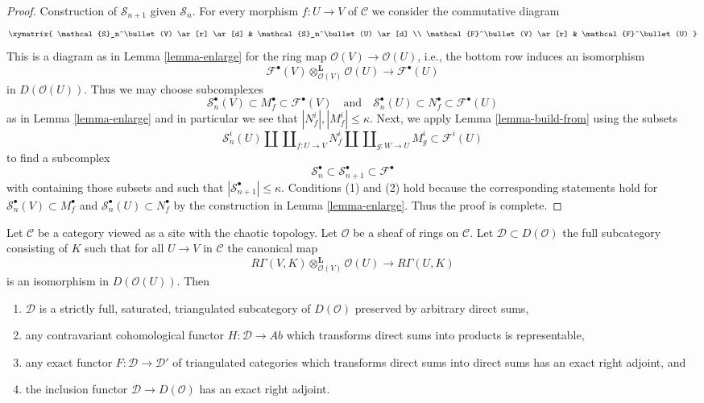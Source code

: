 \begin{proof}
\medskip\noindent
Construction of $\mathcal{S}_{n + 1}$ given $\mathcal{S}_n$.
For every morphism $f : U \to V$ of $\mathcal{C}$
we consider the commutative diagram
$$
\xymatrix{
\mathcal{S}_n^\bullet(V)
\ar[r] \ar[d] &
\mathcal{S}_n^\bullet(U) \ar[d] \\
\mathcal{F}^\bullet(V)
\ar[r] &
\mathcal{F}^\bullet(U)
}
$$
This is a diagram as in Lemma \ref{lemma-enlarge} for the ring map
$\mathcal{O}(V) \to \mathcal{O}(U)$, i.e., the bottom row induces
an isomorphism
$$
\mathcal{F}^\bullet(V) \otimes_{\mathcal{O}(V)}^\mathbf{L} \mathcal{O}(U)
\longrightarrow
\mathcal{F}^\bullet(U)
$$
in $D(\mathcal{O}(U))$. Thus we may choose subcomplexes
$$
\mathcal{S}_n^\bullet(V) \subset M^\bullet_f \subset \mathcal{F}^\bullet(V)
\quad\text{and}\quad
\mathcal{S}_n^\bullet(U) \subset N^\bullet_f \subset \mathcal{F}^\bullet(U)
$$
as in Lemma \ref{lemma-enlarge} and in particular we see that
$|N^i_f|, |M^i_f| \leq \kappa$. Next, we apply
Lemma \ref{lemma-build-from} using the subsets
$$
\mathcal{S}_n^i(U) \amalg \coprod\nolimits_{f : U \to V} N^i_f
\amalg \coprod\nolimits_{g : W \to U} M^i_g
\subset
\mathcal{F}^i(U)
$$
to find a subcomplex
$$
\mathcal{S}_n^\bullet \subset
\mathcal{S}_{n + 1}^\bullet \subset
\mathcal{F}^\bullet
$$
with containing those subsets and such that
$|\mathcal{S}_{n + 1}^\bullet| \leq \kappa$.
Conditions (1) and (2) hold because the corresponding statements
hold for 
$\mathcal{S}_n^\bullet(V) \subset M^\bullet_f$ and
$\mathcal{S}_n^\bullet(U) \subset N^\bullet_f$ by the construction in
Lemma \ref{lemma-enlarge}. Thus the proof is complete.
\end{proof}

\begin{proposition}
\label{proposition-cartesian-brown}
Let $\mathcal{C}$ be a category viewed as a site with
the chaotic topology. Let $\mathcal{O}$ be a sheaf of rings on $\mathcal{C}$.
Let $\mathcal{D} \subset D(\mathcal{O})$ the full subcategory
consisting of $K$ such that for all $U \to V$ in $\mathcal{C}$
the canonical map
$$
R\Gamma(V, K) \otimes_{\mathcal{O}(V)}^\mathbf{L} \mathcal{O}(U)
\longrightarrow
R\Gamma(U, K)
$$
is an isomorphism in $D(\mathcal{O}(U))$. Then
\begin{enumerate}
\item $\mathcal{D}$ is a strictly full, saturated, triangulated
subcategory of $D(\mathcal{O})$ preserved by arbitrary direct sums,
\item any contravariant cohomological functor $H : \mathcal{D} \to \textit{Ab}$
which transforms direct sums into products is representable,
\item any exact functor $F : \mathcal{D} \to \mathcal{D}'$ of triangulated
categories which transforms direct sums into direct sums has an exact
right adjoint, and
\item the inclusion functor $\mathcal{D} \to D(\mathcal{O})$ has
an exact right adjoint.
\end{enumerate}
\end{proposition}

